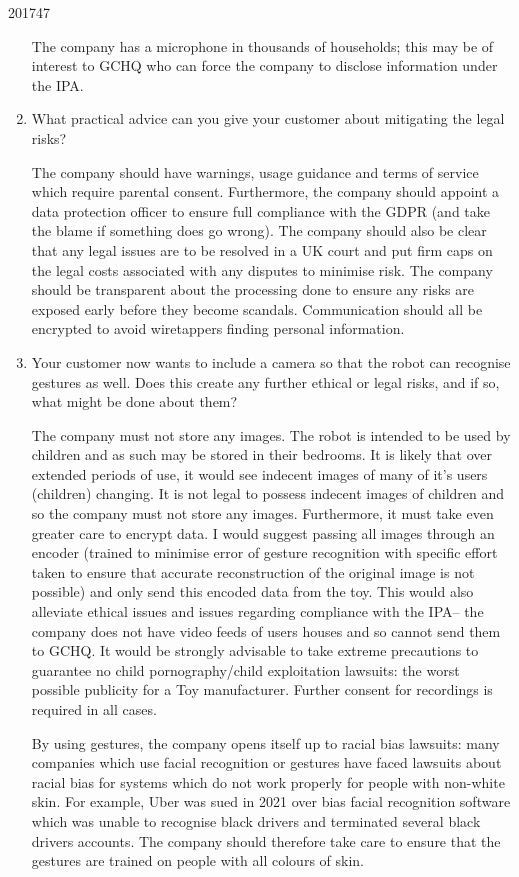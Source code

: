 \documentclass[10pt,\jkfside,a4paper]{article}
\begin{document}
\begin{examquestion}{2017}{4}{7}
\begin{enumerate}[label=(\alph*)]
The company has a microphone in thousands of households; this may be of
interest to GCHQ who can force the company to disclose information under the
IPA\@.

\item What practical advice can you give your customer about mitigating the
legal risks?

The company should have warnings, usage guidance and terms of service which
require parental consent. Furthermore, the company should appoint a data
protection officer to ensure full compliance with the GDPR (and take the
blame if something does go wrong). The company should also be clear that any
legal issues are to be resolved in a UK court and put firm caps on the
legal costs associated with any disputes to minimise risk. The company
should be transparent about the processing done to ensure any risks are
exposed early before they become scandals. Communication should all be
encrypted to avoid wiretappers finding personal information.

\item Your customer now wants to include a camera so that the robot can
recognise gestures as well. Does this create any further ethical or legal
risks, and if so, what might be done about them?

The company must not store any images. The robot is intended to be used by
children and as such may be stored in their bedrooms. It is likely that over
extended periods of use, it would see indecent images of many of it's users
(children) changing. It is not legal to possess indecent images of children
and so the company must not store any images. Furthermore, it must take even
greater care to encrypt data. I would suggest passing all images through an
encoder (trained to minimise error of gesture recognition with specific
effort taken to ensure that accurate reconstruction of the original image
is not possible) and only send this encoded data from the toy. This would
also alleviate ethical issues and issues regarding compliance with the
IPA\@ -- the company does not have video feeds of users houses and so
cannot send them to GCHQ\@. It would be strongly advisable to take extreme
precautions to guarantee no child pornography/child exploitation lawsuits:
the worst possible publicity for a Toy manufacturer. Further consent for
recordings is required in all cases.

By using gestures, the company opens itself up to racial bias lawsuits: many
companies which use facial recognition or gestures have faced lawsuits about
racial bias for systems which do not work properly for people with non-white
skin. For example, Uber was sued in 2021 over bias facial recognition
software which was unable to recognise black drivers and terminated
several black drivers accounts. The company should therefore take care to
ensure that the gestures are trained on people with all colours of skin.


\end{enumerate}
\end{examquestion}
\end{document}
